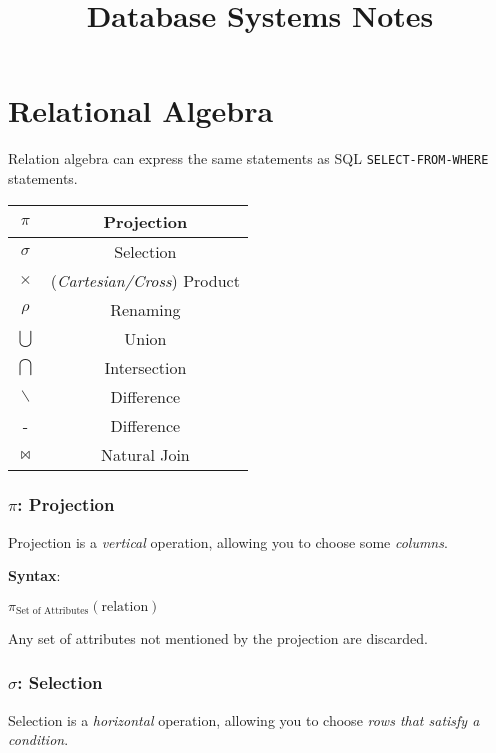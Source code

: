 \documentclass{article}
\begin{document}
\pagestyle{empty}

\title{Database Systems Notes}
\date{}
\maketitle

\section{Relational Algebra}

Relation algebra can express the same statements as SQL \texttt{SELECT-FROM-WHERE} statements.

\begin{center}
  \begin{tabular}{|c|c|}
    \hline
    $\pi$ & Projection\\
    \hline
    $\sigma$ & Selection\\
    \hline
    $\times$ & (\textit{Cartesian/Cross}) Product\\
    \hline
    $\rho$ & Renaming\\
    \hline
    $\bigcup$ & Union\\
    \hline
    $\bigcap$ & Intersection\\
    \hline
    $\backslash$ & Difference\\
    \hline
    - & Difference\\
    \hline
    $\Join$ & Natural Join\\
    \hline
  \end{tabular}
\end{center}

\subsubsection{$\pi$: Projection}

Projection is a \textit{vertical} operation, allowing you to choose some \textit{columns}.

\textbf{Syntax}:

$\pi_{\text{Set of Attributes}}(\text{relation})$

Any set of attributes not mentioned by the projection are discarded.

\subsubsection{$\sigma$: Selection}

Selection is a \textit{horizontal} operation, allowing you to choose \textit{rows that satisfy a condition}.
\end{document}

